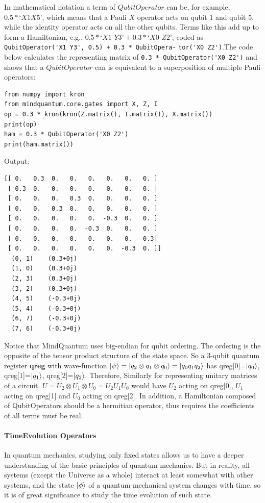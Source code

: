 In mathematical notation a term of $QubitOperator$ can be, for example, $0.5 * ‘X1 X5’$, which means that a Pauli $X$ operator acts on qubit $1$ and qubit $5$, while the identity operator acts on all the other qubits. Terms like this add up to form a Hamiltonian, e.g., $0.5 * ‘X1$ $Y3’ + 0.3 * ‘X0$ $Z2’$, coded as \verb|QubitOperator('X1 Y3', 0.5) + 0.3 * QubitOpera-| \verb|tor('X0 Z2')|.The code below calculates the representing matrix of \verb|0.3 * QubitOperator('X0 Z2')| and shows that a $QubitOperator$ can is equivalent to a superposition of multiple Pauli operators:
\begin{lstlisting}
from numpy import kron
from mindquantum.core.gates import X, Z, I
op = 0.3 * kron(kron(Z.matrix(), I.matrix()), X.matrix())
print(op)
ham = 0.3 * QubitOperator('X0 Z2')
print(ham.matrix())
\end{lstlisting}
Output:
\begin{lstlisting}
[[ 0.   0.3  0.   0.   0.   0.   0.   0. ]
 [ 0.3  0.   0.   0.   0.   0.   0.   0. ]
 [ 0.   0.   0.   0.3  0.   0.   0.   0. ]
 [ 0.   0.   0.3  0.   0.   0.   0.   0. ]
 [ 0.   0.   0.   0.   0.  -0.3  0.   0. ]
 [ 0.   0.   0.   0.  -0.3  0.   0.   0. ]
 [ 0.   0.   0.   0.   0.   0.   0.  -0.3]
 [ 0.   0.   0.   0.   0.   0.  -0.3  0. ]]
  (0, 1)	(0.3+0j)
  (1, 0)	(0.3+0j)
  (2, 3)	(0.3+0j)
  (3, 2)	(0.3+0j)
  (4, 5)	(-0.3+0j)
  (5, 4)	(-0.3+0j)
  (6, 7)	(-0.3+0j)
  (7, 6)	(-0.3+0j)
\end{lstlisting}
Notice that MindQuantum uses big-endian for qubit ordering. The ordering is the opposite of the tensor product structure of the state space. So a 3-qubit quantum register \textbf{qreg} with wave-function $\ket{\psi}=\ket{q_2\otimes q_1 \otimes q_0}=\ket{q_0 q_1 q_2}$  has qreg[0]=$\ket{q_0}$, qreg[1]=$\ket{q_1}$, qreg[2]=$\ket{q_2}$. Therefore, Similarly for representing unitary matrices of a circuit. $U=U_2 \otimes{U_1}\otimes{U_0}=U_2 U_1 U_0$ would have $U_2$ acting on qreg[0], $U_1$ acting on qreg[1] and $U_0$ acting on qreg[2]. In addition, a Hamiltonian composed of QubitOperators should be a hermitian operator, thus requires the coefficients of all terms must be real.

\paragraph{TimeEvolution Operators}
In quantum mechanics, studying only fixed states allows us to have a deeper understanding of the basic principles of quantum mechanics. But in reality, all systems (except the Universe as a whole) interact at least somewhat with other systems, and the state $\ket{\phi}$ of a quantum mechanical system changes with time, so it is of great significance to study the time evolution of such state.

